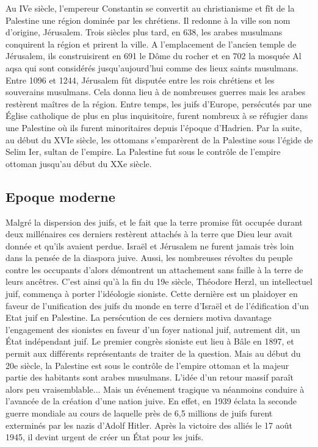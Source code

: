 Au IVe siècle, l'empereur Constantin se convertit au christianisme et fît de la Palestine une région dominée par les chrétiens. Il redonne à la ville son nom d'origine, Jérusalem. Trois siècles plus tard, en 638, les arabes musulmans conquirent la région et prirent la ville. A l'emplacement de l'ancien temple de Jérusalem, ils construisirent en 691 le Dôme du rocher et en 702 la mosquée Al aqsa qui sont considérés jusqu'aujourd'hui comme des lieux saints musulmans. Entre 1096 et 1244, Jérusalem fût disputée entre les rois chrétiens et les souverains musulmans. Cela donna lieu à de nombreuses guerres mais les arabes restèrent maîtres de la région. Entre temps, les juifs d'Europe, persécutés par une Église catholique de plus en plus inquisitoire, furent nombreux à se réfugier dans une Palestine où ils furent minoritaires depuis l'époque d'Hadrien. 
Par la suite, au début du XVIe siècle, les ottomans s'emparèrent de la Palestine sous l'égide de Selim Ier, sultan de l'empire. La Palestine fut sous le contrôle de l'empire ottoman jusqu'au début du XXe siècle.

\subsection*{Epoque moderne}

Malgré la dispersion des juifs, et le fait que la terre promise fût occupée durant deux millénaires ces derniers restèrent attachés à la terre que Dieu leur avait donnée et qu'ils avaient perdue. Israël et Jérusalem ne furent jamais très loin dans la pensée de la diaspora juive. Aussi, les nombreuses révoltes du peuple contre les occupants d'alors démontrent un attachement sans faille à la terre de leurs ancêtres. C'est ainsi qu'à la fin du 19e siècle, Théodore Herzl, un intellectuel juif, commença à porter l'idéologie sioniste. Cette dernière est un plaidoyer en faveur de l'unification des juifs du monde en terre d'Israël et de l'édification d'un Etat juif en Palestine. La persécution de ces derniers motiva davantage l'engagement des sionistes en faveur d'un foyer national juif, autrement dit, un État indépendant juif. Le premier congrès sioniste eut lieu à Bâle en 1897, et permit aux différents représentants de traiter de la question. Mais au début du 20e siècle, la Palestine est sous le contrôle de l'empire ottoman et la majeur partie des habitants sont arabes musulmans. L'idée d'un retour massif paraît alors peu vraisemblable...
Mais un événement tragique va néanmoins conduire à l'avancée de la création d'une nation juive. En effet, en 1939 éclata la seconde guerre mondiale au cours de laquelle près de 6,5 millions de juifs furent exterminés par les nazis d'Adolf Hitler. Après la victoire des alliés le 17 août 1945, il devint urgent de créer un État pour les juifs.

